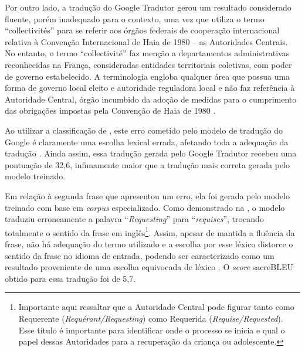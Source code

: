 \documentclass[portuguese]{textolivre}
\begin{document}
Por outro lado, a tradução do Google Tradutor gerou um resultado considerado fluente, porém inadequado para o contexto, uma vez que utiliza o termo “collectivités” para se referir aos órgãos federais de cooperação internacional relativa à Convenção Internacional de Haia de 1980 \cite{hcch_convention_1980} – as Autoridades Centrais. No entanto, o termo “collectivité” faz menção a departamentos administrativas reconhecidas na França, consideradas entidades territoriais coletivas, com poder de governo estabelecido. A terminologia engloba qualquer área que possua uma forma de governo local eleito e autoridade reguladora local e não faz referência à Autoridade Central, órgão incumbido da adoção de medidas para o cumprimento das obrigações impostas pela Convenção de Haia de 1980 \cite{hcch_convention_1980}.

 Ao utilizar a classificação de \textcite{vilar_error_2006}, este erro cometido pelo modelo de tradução do Google é claramente uma escolha lexical errada, afetando toda a adequação da tradução \cite{banitz_machine_2020}. Ainda assim, essa tradução gerada pelo Google Tradutor recebeu uma pontuação de 32,6, infimamente maior que a tradução mais correta gerada pelo modelo treinado.
 
Em relação à segunda frase que apresentou um erro, ela foi gerada pelo modelo treinado com base em \textit{corpus} especializado. Como demonstrado na , o modelo traduziu erroneamente a palavra “\textit{Requesting}” para “\textit{requises}”, trocando totalmente o sentido da frase em inglês\footnote{Importante aqui ressaltar que a Autoridade Central pode figurar tanto como Requerente (\textit{Requérant/Requesting}) como Requerida (\textit{Requise/Requested}). Esse título é importante para identificar onde o processo se inicia e qual o papel dessas Autoridades para a recuperação da criança ou adolescente.}. Assim, apesar de mantida a fluência da frase, não há adequação do termo utilizado \cite{banitz_machine_2020} e a escolha por esse léxico distorce o sentido da frase no idioma de entrada, podendo ser caracterizado como um resultado proveniente de uma escolha equivocada de léxico \cite{vilar_error_2006}. O \textit{score} sacreBLEU obtido para essa tradução foi de 5,7.
\end{document}
